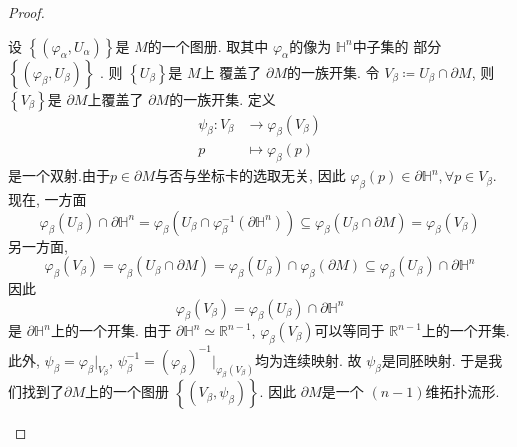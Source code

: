 \documentclass[../main.tex]{subfiles}
\begin{document}
\begin{proof}
\begin{enumerate}
    设 \(  \left\{ \left(  \varphi _{\alpha }, U_{\alpha } \right)  \right\}  \)是 \(  M  \)的一个图册. 取其中 \(   \varphi _{\alpha }  \)的像为 \(  \mathbb{H}^{n}  \)中子集的 部分 \(  \left\{  \left( \varphi _{\beta }, U_{\beta } \right)  \right\}  \)    . 则 \(  \left\{ U_{\beta } \right\}  \)是 \(  M  \)上  覆盖了 \(   \partial M  \)的一族开集.   令 \(  V_{\beta }\coloneqq U_{\beta }\cap  \partial M  \), 则 \(  \left\{ V_{\beta } \right\}  \)是 \(   \partial M  \)上覆盖了 \(   \partial M  \)的一族开集.    定义 \[
   \begin{aligned}
    \psi _{\beta }: V_{\beta }&\to  \varphi _{\beta }\left( V_{\beta } \right) \\ 
      p&\mapsto  \varphi _{\beta }\left( p \right) 
   \end{aligned}
    \] 是一个双射.由于\(  p \in  \partial M  \)与否与坐标卡的选取无关, 因此 \(   \varphi _{\beta }\left( p \right)\in  \partial \mathbb{H}^{n}, \forall p \in V_{\beta }   \). 现在, 一方面 \[
     \varphi _{\beta }\left( U_{\beta } \right)\cap  \partial \mathbb{H}^{n}=  \varphi _{\beta }\left( U_{\beta }\cap   \varphi _{\beta }^{-1} \left(  \partial \mathbb{H}^{n} \right)  \right)\subseteq  \varphi _{\beta }\left( U_{\beta }\cap  \partial M \right)=  \varphi _{\beta }\left( V_{\beta } \right)    
    \]另一方面, \[
     \varphi _{\beta }\left( V_{\beta } \right)=  \varphi _{\beta }\left( U_{\beta }\cap  \partial M \right)=  \varphi _{\beta }\left( U_{\beta } \right)\cap  \varphi _{\beta }\left(  \partial M \right)\subseteq  \varphi _{\beta }\left( U_{\beta } \right)\cap  \partial \mathbb{H}^{n}     
    \]因此 \[
     \varphi _{\beta }\left( V_{\beta } \right)=   \varphi _{\beta }\left( U_{\beta } \right)\cap  \partial \mathbb{H}^{n}  
    \]是 \(   \partial \mathbb{H}^{n} \)上的一个开集.  由于 \(   \partial \mathbb{H}^{n}\simeq \mathbb{R} ^{n-1}  \), \(   \varphi _{\beta }\left( V_{\beta } \right)   \)可以等同于 \(  \mathbb{R} ^{n-1}  \)上的一个开集.  此外,  \(  \psi _{\beta }=  \varphi _{\beta }|_{V_{\beta }}  \),  \(  \psi _{\beta }^{-1} = \left(  \varphi _{\beta } \right)^{-1} |_{ \varphi _{\beta }\left( V_{\beta } \right) }   \)均为连续映射.    故 \(  \psi _{\beta }  \)是同胚映射. 于是我们找到了\(   \partial M  \)上的一个图册 \(  \left\{ \left( V_{\beta }, \psi _{\beta } \right)  \right\}  \). 因此 \(   \partial M  \)是一个 \(  \left( n-1 \right)   \)维拓扑流形.    

\end{enumerate}
\end{proof}
\end{document}
